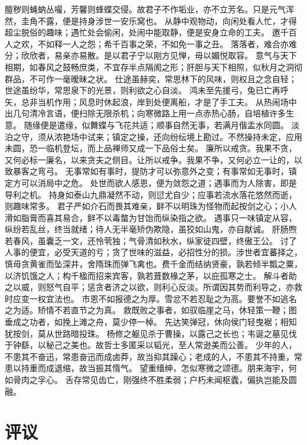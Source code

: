 \documentclass[12pt,UTF8]{ctexbook}
\begin{document}
膻秽则蝇蚋丛嘬，芳馨则蜂蝶交侵。故君子不作垢业，亦不立芳名。只是元气浑然，圭角不露，便是持身涉世一安乐窝也。
从静中观物动，向闲处看人忙，才得超尘脱俗的趣味；遇忙处会偷闲，处闹中能取静，便是安身立命的工夫。
邀千百人之欢，不如释一人之怨；希千百事之荣，不如免一事之丑。
落落者，难合亦难分；欣欣者，易亲亦易散。是以君子宁以刚方见惮，毋以媚悦取容。
意气与天下相期，如春风之鼓畅庶类，不宜存半点隔阂之形；肝胆与天下相照，似秋月之洞彻群品，不可作一毫暧昧之状。
仕途虽赫奕，常思林下的风味，则权且之念自轻；世途虽纷华，常思泉下的光景，则利欲之心自淡。
鸿未至先援弓，兔已亡再呼矢，总非当机作用；风息时休起浪，岸到处便离船，才是了手工夫。
从热闹场中出几句清冷言语，便扫除无限杀机；向寒微路上用一点赤热心肠，自培植许多生意。
随缘便是遣缘，似舞蝶与飞花共适；顺事自然无事，若满月偕盂水同圆。
淡泊之守，须从浓艳场中试来；镇定之操，还向纷纭境上勘过。不然操持未定，应用未圆，恐一临机登坛，而上品禅师又成一下品俗士矣。
廉所以戒贪。我果不贪，又何必标一廉名，以来贪夫之侧目。让所以戒争。我果不争，又何必立一让的，以致暴客之弯弓。
无事常如有事时，提防才可以弥意外之变；有事常如无事时，镇定方可以消局中之危。
处世而欲人感恩，便为敛怨之道；遇事而为人除害，即是导利之机。
持身如泰山九鼎凝然不动，则愆尤自少；应事若流水落花悠然而逝，则趣味常多。
君子严如介石而畏其难亲，鲜不以明珠为怪物而起按剑之心；小人滑如脂膏而喜其易合，鲜不以毒螫为甘饴而纵染指之欲。
遇事只一味镇定从容，纵纷若乱丝，终当就绪；待人无半毫矫伪欺隐，虽狡如山鬼，亦自献诚。
肝肠煦若春风，虽囊乏一文，还怜茕独；气骨清如秋水，纵家徒四壁，终傲王公。
讨了人事的便宜，必受天道的亏；贪了世味的滋益，必招性分的损。涉世者宜蕃择之，慎毋贪黄雀而坠深井，舍隋珠而弹飞禽也。费千金而结纳贤豪，孰若倾半瓢之粟，以济饥饿之人；构千楹而招来宾客，孰若葺数椽之茅，以庇孤寒之士。
解斗者助之以威，则怒气自平；惩贪者济之以欲，则利心反淡。所谓因其势而利导之，亦救时应变一权宜法也。
市恩不如报德之为厚。雪忿不若忍耻之为高。要誉不如逃名之为适。矫情不若直节之为真。
救既败之事者，如驭临崖之马，休轻策一鞭；图垂成之功者，如挽上滩之舟，莫少停一棹。
先达笑弹冠，休向侯门轻曳裾；相知犹按剑，莫从世路暗投珠。
杨修之躯见杀于曹操，以露己之长也；韦诞之墓见伐于钟繇，以秘己之美也。故哲士多匿采以韬光，至人常逊美而公善。
少年的人，不患其不奋迅，常患奋迅而成卤莽，故当抑其躁心；老成的人，不患其不持重，常患以持重而成退缩，故当振其惰气。
望重缙绅，怎似寒微之颂德。朋来海宇，何如骨肉之孚心。
舌存常见齿亡，刚强终不胜柔弱；户朽未闻枢蠹，偏执岂能及圆融。

\chapter{评议}
\end{document}
